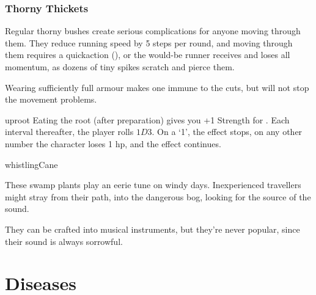 \begin{multicols}{2}
\subsubsection{Thorny Thickets}
\label{thorny_thickets}

Regular thorny bushes create serious complications for anyone moving through them.
They reduce running speed by 5 \glspl{step} per round, and moving through them requires a  \gls{quickaction} (\tn[10]), or the would-be runner receives  and loses all momentum, as dozens of tiny spikes scratch and pierce them.

Wearing sufficiently full armour makes one immune to the cuts, but will not stop the movement problems.

%
  {uproot}%
  {
  Eating the root (after preparation) gives you +1 Strength for .
  Each \gls{interval} thereafter, the player rolls $1D3$.
  On a `1', the effect stops, on any other number the character loses 1 \gls{hp}, and the effect continues.
    }

%
  {whistlingCane}%
  {
  These swamp plants play an eerie tune on windy days.
  Inexperienced travellers might stray from their path, into the dangerous bog, looking for the source of the sound.

  They can be crafted into musical instruments, but they're never popular, since their sound is always sorrowful.
  }

\end{multicols}

\section{Diseases}
\label{diseases}

\newcommand\disease[5][\roll{Intelligence}{Medicine}]{
  \subsubsection{#2}
  \index{#2 \glsentrytext{sickness}}
  \label{#2}
  #3
  \needspace{2em}
  \begin{description}
    \item[\flwr~\Glspl{ingredient}] #4
    \item[Roll] #1 (\tn[#5])
  \end{description}
}

